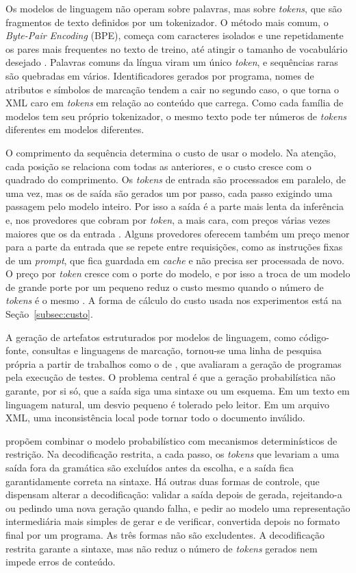 Os modelos de linguagem não operam sobre palavras, mas sobre \textit{tokens}, que são fragmentos de texto definidos por um tokenizador. O método mais comum, o \textit{Byte-Pair Encoding} (BPE), começa com caracteres isolados e une repetidamente os pares mais frequentes no texto de treino, até atingir o tamanho de vocabulário desejado \cite{sennrich2016neural}. Palavras comuns da língua viram um único \textit{token}, e sequências raras são quebradas em vários. Identificadores gerados por programa, nomes de atributos e símbolos de marcação tendem a cair no segundo caso, o que torna o XML caro em \textit{tokens} em relação ao conteúdo que carrega. Como cada família de modelos tem seu próprio tokenizador, o mesmo texto pode ter números de \textit{tokens} diferentes em modelos diferentes.

O comprimento da sequência determina o custo de usar o modelo. Na atenção, cada posição se relaciona com todas as anteriores, e o custo cresce com o quadrado do comprimento. Os \textit{tokens} de entrada são processados em paralelo, de uma vez, mas os de saída são gerados um por passo, cada passo exigindo uma passagem pelo modelo inteiro. Por isso a saída é a parte mais lenta da inferência e, nos provedores que cobram por \textit{token}, a mais cara, com preços várias vezes maiores que os da entrada \cite{togetherpricing2026}. Alguns provedores oferecem também um preço menor para a parte da entrada que se repete entre requisições, como as instruções fixas de um \textit{prompt}, que fica guardada em \textit{cache} e não precisa ser processada de novo. O preço por \textit{token} cresce com o porte do modelo, e por isso a troca de um modelo de grande porte por um pequeno reduz o custo mesmo quando o número de \textit{tokens} é o mesmo \cite{belcak2025small}. A forma de cálculo do custo usada nos experimentos está na Seção~\ref{subsec:custo}.

A geração de artefatos estruturados por modelos de linguagem, como código-fonte, consultas e linguagens de marcação, tornou-se uma linha de pesquisa própria a partir de trabalhos como o de , que avaliaram a geração de programas pela execução de testes. O problema central é que a geração probabilística não garante, por si só, que a saída siga uma sintaxe ou um esquema. Em um texto em linguagem natural, um desvio pequeno é tolerado pelo leitor. Em um arquivo XML, uma inconsistência local pode tornar todo o documento inválido.

 propõem combinar o modelo probabilístico com mecanismos determinísticos de restrição. Na decodificação restrita, a cada passo, os \textit{tokens} que levariam a uma saída fora da gramática são excluídos antes da escolha, e a saída fica garantidamente correta na sintaxe. Há outras duas formas de controle, que dispensam alterar a decodificação: validar a saída depois de gerada, rejeitando-a ou pedindo uma nova geração quando falha, e pedir ao modelo uma representação intermediária mais simples de gerar e de verificar, convertida depois no formato final por um programa. As três formas não são excludentes. A decodificação restrita garante a sintaxe, mas não reduz o número de \textit{tokens} gerados nem impede erros de conteúdo.

